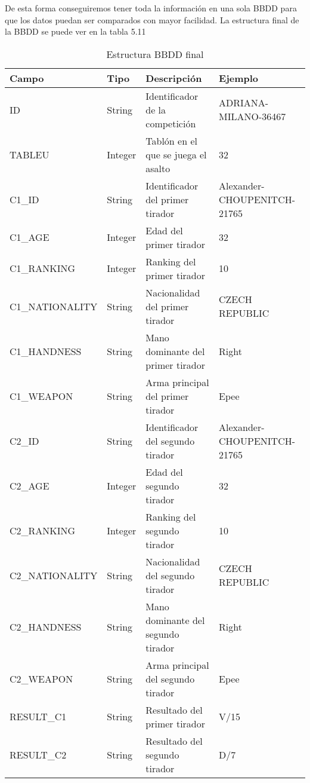 De esta forma conseguiremos tener toda la información en una sola BBDD para
que los datos puedan ser comparados con mayor facilidad. La estructura final
de la BBDD se puede ver en la tabla 5.11

\begin{table}[]
  \centering
  \caption{Estructura BBDD final}
  \label{Estructura BBDD final}
  \begin{tabular}{|llll|}
    \hline \rowcolor[HTML]{C0C0C0}
    Campo & Tipo & Descripción & Ejemplo \\ \hline
    ID & String & Identificador de la competición & ADRIANA-MILANO-36467 \\ \hline
    TABLEU & Integer & Tablón en el que se juega el asalto & 32 \\ \hline

    \rowcolor[HTML]{969696}
    C1\_ID & String & Identificador del primer tirador & Alexander-CHOUPENITCH-21765 \\ \hline
    \rowcolor[HTML]{969696}
    C1\_AGE & Integer & Edad del primer tirador & 32 \\ \hline
    \rowcolor[HTML]{969696}
    C1\_RANKING & Integer & Ranking del primer tirador & 10 \\ \hline
    \rowcolor[HTML]{969696}
    C1\_NATIONALITY & String & Nacionalidad del primer tirador & CZECH REPUBLIC \\ \hline
    \rowcolor[HTML]{969696}
    C1\_HANDNESS & String & Mano dominante del primer tirador & Right \\ \hline
    \rowcolor[HTML]{969696}
    C1\_WEAPON & String & Arma principal del primer tirador & Epee \\ \hline

    \rowcolor[HTML]{636363}
    C2\_ID & String & Identificador del segundo tirador & Alexander-CHOUPENITCH-21765 \\ \hline
    \rowcolor[HTML]{636363}
    C2\_AGE & Integer & Edad del segundo tirador & 32 \\ \hline
    \rowcolor[HTML]{636363}
    C2\_RANKING & Integer & Ranking del segundo tirador & 10 \\ \hline
    \rowcolor[HTML]{636363}
    C2\_NATIONALITY & String & Nacionalidad del segundo tirador & CZECH REPUBLIC \\ \hline
    \rowcolor[HTML]{636363}
    C2\_HANDNESS & String & Mano dominante del segundo tirador & Right \\ \hline
    \rowcolor[HTML]{636363}
    C2\_WEAPON & String & Arma principal del segundo tirador & Epee \\ \hline

    \rowcolor[HTML]{969696}
    RESULT\_C1 & String & Resultado del primer tirador & V/15 \\ \hline
    \rowcolor[HTML]{636363}
    RESULT\_C2 & String & Resultado del segundo tirador & D/7 \\ \hline

  \end{tabular}
\end{table}

